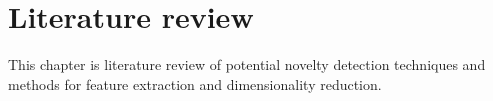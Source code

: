 \chapter{Literature review}\label{cha:litterature}

This chapter is literature review of potential novelty detection techniques and methods for feature extraction and dimensionality reduction. 

    
